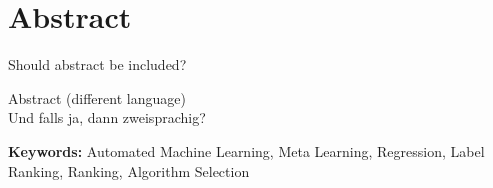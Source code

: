 %
\chapter*{Abstract}
\label{sec:abstract}
\vspace*{-10mm}

Should abstract be included?






\vspace*{20mm}

{Abstract (different language)}\label{sec:abstract-diff} \\

Und falls ja, dann zweisprachig?

\textbf{Keywords: } Automated Machine Learning, Meta Learning, Regression, Label Ranking, Ranking, Algorithm Selection

